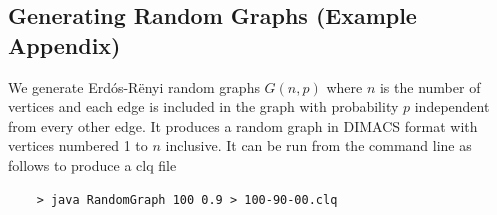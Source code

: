 \documentclass{l4proj}
\begin{document}
\begin{appendices}
\chapter{Generating Random Graphs (Example Appendix)}
\label{sec:randomGraph}
We generate Erd\'{o}s-R\"{e}nyi random graphs $G(n,p)$ where $n$ is the number of vertices and
each edge is included in the graph with probability $p$ independent from every other edge. It produces
a random graph in DIMACS format with vertices numbered 1 to $n$ inclusive. It can be run from the command line as follows to produce
a clq file
\begin{verbatim}
	> java RandomGraph 100 0.9 > 100-90-00.clq
\end{verbatim}
\end{appendices}




\end{document}
